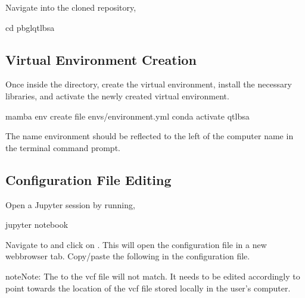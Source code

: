 \documentclass[letterpaper,10pt,english]{sphinxhowto}
\begin{document}
\sphinxAtStartPar
Navigate into the cloned repository,

\begin{sphinxVerbatim}[commandchars=\\\{\}]
\PYGZdl{} cd pbgl\PYGZhy{}qtl\PYGZhy{}bsa
\end{sphinxVerbatim}


\subsection{Virtual Environment Creation}
\label{\detokenize{index:virtual-environment-creation}}
\sphinxAtStartPar
Once inside the  directory, create the  virtual environment, install the necessary libraries, and activate the newly created  virtual environment.

\begin{sphinxVerbatim}[commandchars=\\\{\}]
\PYGZdl{} mamba env create \PYGZhy{}\PYGZhy{}file envs/environment.yml
\PYGZdl{} conda activate qtl\PYGZhy{}bsa
\end{sphinxVerbatim}

\sphinxAtStartPar
The name  environment should be reflected to the left of the computer name in the terminal command prompt.


\subsection{Configuration File Editing}
\label{\detokenize{index:configuration-file-editing}}
\sphinxAtStartPar
Open a Jupyter session by running,

\begin{sphinxVerbatim}[commandchars=\\\{\}]
\PYGZdl{} jupyter notebook
\end{sphinxVerbatim}

\sphinxAtStartPar
Navigate to  and click on . This will open the configuration file in a new web\sphinxhyphen{}browser tab. Copy/paste the following in the configuration file.

\begin{sphinxadmonition}{note}{Note:}
\sphinxAtStartPar
The  to the vcf file will not match. It needs to be edited accordingly to point towards the location of the vcf file stored locally in the user’s computer.
\end{sphinxadmonition}
\end{document}
